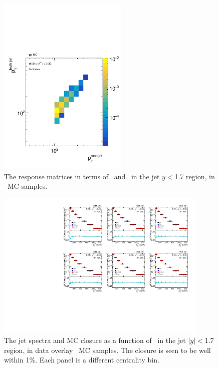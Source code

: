 \begin{figure}[ht]
\centering
\includegraphics[page=5, width=0.55\textwidth]{figures/main/corrections/resp_matrix_jet_pp_MC.pdf}
\caption{The response matrices in terms of \ptjetreco\ and \ptjettruth\ in the jet $y < $1.7 region, in \pp\ MC samples.}
\label{fig:pp_jetspect_respmatrix}
\end{figure}

\begin{figure}[ht]
\centering
\includegraphics[page=5, width=0.9\textwidth]{figures/main/corrections/spect_closure_PbPb_MC.pdf}
\caption{The jet spectra and MC closure as a function of \ptjet\ in the jet $|y| < $1.7 region, in data overlay \pbpb\ MC samples. The closure is seen to be well within 1\%. Each panel is a different centrality bin.}
\label{fig:PbPb_jetspect_closure}
\end{figure}

